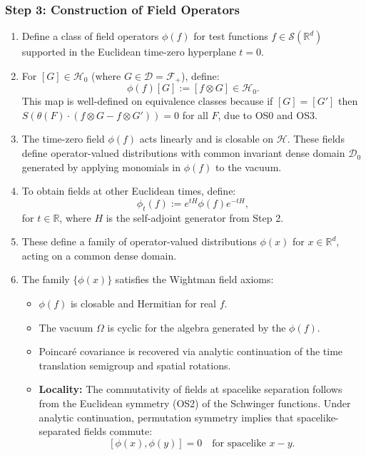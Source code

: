 \documentclass{article}
\begin{document}
\subsubsection*{Step 3: Construction of Field Operators}

\begin{enumerate}
  \item Define a class of field operators $\phi(f)$ for test functions $f \in \mathcal{S}(\mathbb{R}^d)$ supported in the Euclidean time-zero hyperplane $t = 0$.

  \item For $[G] \in \mathcal{H}_0$ (where $G \in \mathscr{D} = \mathcal{F}_+$), define:
  \[
  \phi(f)[G] := [f \otimes G] \in \mathcal{H}_0.
  \]
  This map is well-defined on equivalence classes because if $[G] = [G']$ then $S(\theta(F) \cdot (f \otimes G - f \otimes G')) = 0$ for all $F$, due to OS0 and OS3.

  \item The time-zero field $\phi(f)$ acts linearly and is closable on $\mathcal{H}$. These fields define operator-valued distributions with common invariant dense domain $\mathscr{D}_0$ generated by applying monomials in $\phi(f)$ to the vacuum.

  \item To obtain fields at other Euclidean times, define:
  \[
  \phi_t(f) := e^{tH} \phi(f) e^{-tH},
  \]
  for $t \in \mathbb{R}$, where $H$ is the self-adjoint generator from Step 2.

  \item These define a family of operator-valued distributions $\phi(x)$ for $x \in \mathbb{R}^d$, acting on a common dense domain.

  \item The family $\{ \phi(x) \}$ satisfies the Wightman field axioms:
  \begin{itemize}
    \item $\phi(f)$ is closable and Hermitian for real $f$.
    \item The vacuum $\Omega$ is cyclic for the algebra generated by the $\phi(f)$.
    \item Poincaré covariance is recovered via analytic continuation of the time translation semigroup and spatial rotations.
    \item \textbf{Locality:} The commutativity of fields at spacelike separation follows from the Euclidean symmetry (OS2) of the Schwinger functions. Under analytic continuation, permutation symmetry implies that spacelike-separated fields commute:
    \[
    [\phi(x), \phi(y)] = 0 \quad \text{for spacelike } x - y.
    \]
  \end{itemize}
\end{enumerate}
\end{document}

